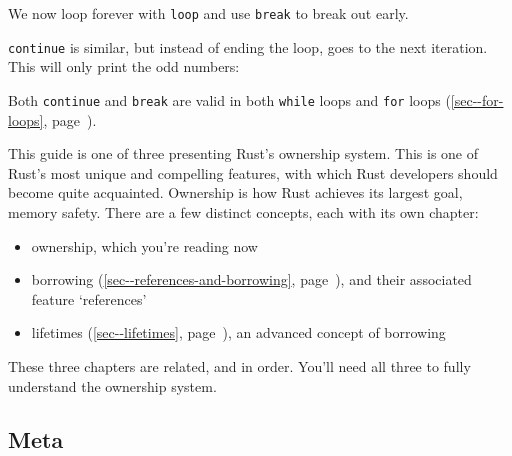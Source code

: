 \documentclass[a4paper,]{book}
\renewcommand*{\hyperref}[2][\ar]{%
  \def\ar{#2}%
  #2 (\autoref{#1}, page~\pageref{#1})}
\newenvironment{Shaded}{\begin{snugshade}}{\end{snugshade}}
\newcommand{\KeywordTok}[1]{\textcolor[rgb]{0.13,0.29,0.53}{\textbf{{#1}}}}
\newcommand{\DecValTok}[1]{\textcolor[rgb]{0.00,0.00,0.81}{{#1}}}
\newcommand{\StringTok}[1]{\textcolor[rgb]{0.31,0.60,0.02}{{#1}}}
\newcommand{\OtherTok}[1]{\textcolor[rgb]{0.56,0.35,0.01}{{#1}}}
\newcommand{\NormalTok}[1]{{#1}}
\begin{document}
We now loop forever with \texttt{loop} and use \texttt{break} to break
out early.

\texttt{continue} is similar, but instead of ending the loop, goes to
the next iteration. This will only print the odd numbers:

\begin{Shaded}
\end{Shaded}

Both \texttt{continue} and \texttt{break} are valid in both
\texttt{while} loops and \hyperref[sec--for-loops]{\texttt{for} loops}.


This guide is one of three presenting Rust's ownership system. This is
one of Rust's most unique and compelling features, with which Rust
developers should become quite acquainted. Ownership is how Rust
achieves its largest goal, memory safety. There are a few distinct
concepts, each with its own chapter:

\begin{itemize}
\itemsep1pt\parskip0pt
\item
  ownership, which you're reading now
\item
  \hyperref[sec--references-and-borrowing]{borrowing}, and their
  associated feature `references'
\item
  \hyperref[sec--lifetimes]{lifetimes}, an advanced concept of borrowing
\end{itemize}

These three chapters are related, and in order. You'll need all three to
fully understand the ownership system.

\subsection{Meta}\label{meta}
\end{document}
